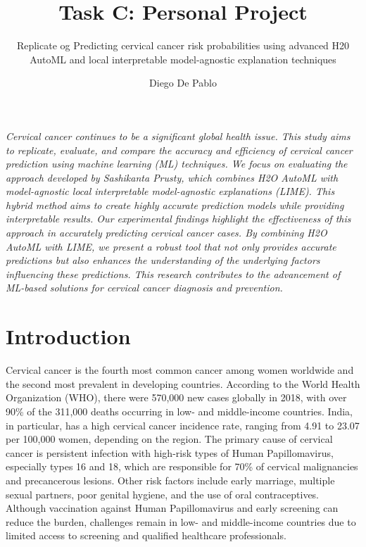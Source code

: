 \documentclass{llncs}
\begin{document}
\title{Task C: Personal Project}
\subtitle{Replicate og Predicting cervical cancer risk probabilities using advanced H20 AutoML and local interpretable model-agnostic explanation techniques}

\author{Diego De Pablo}

\maketitle 

\vspace{1cm} %

\textit{
	Cervical cancer continues to be a significant global health issue. This study aims to replicate, evaluate, and compare the accuracy and efficiency of cervical cancer prediction using machine learning (ML) techniques. We focus on evaluating the approach developed by Sashikanta Prusty\cite{prusty2024predicting}, which combines H2O AutoML with model-agnostic local interpretable model-agnostic explanations (LIME). This hybrid method aims to create highly accurate prediction models while providing interpretable results. Our experimental findings highlight the effectiveness of this approach in accurately predicting cervical cancer cases. By combining H2O AutoML with LIME, we present a robust tool that not only provides accurate predictions but also enhances the understanding of the underlying factors influencing these predictions. This research contributes to the advancement of ML-based solutions for cervical cancer diagnosis and prevention.
	 }



\section{Introduction}

Cervical cancer is the fourth most common cancer among women worldwide and the second most prevalent in developing countries. According to the World Health Organization (WHO), there were 570,000 new cases globally in 2018, with over 90\% of the 311,000 deaths occurring in low- and middle-income countries. India, in particular, has a high cervical cancer incidence rate, ranging from 4.91 to 23.07 per 100,000 women, depending on the region. The primary cause of cervical cancer is persistent infection with high-risk types of Human Papillomavirus, especially types 16 and 18, which are responsible for 70\% of cervical malignancies and precancerous lesions. Other risk factors include early marriage, multiple sexual partners, poor genital hygiene, and the use of oral contraceptives. Although vaccination against Human Papillomavirus and early screening can reduce the burden, challenges remain in low- and middle-income countries due to limited access to screening and qualified healthcare professionals. 
\end{document}

